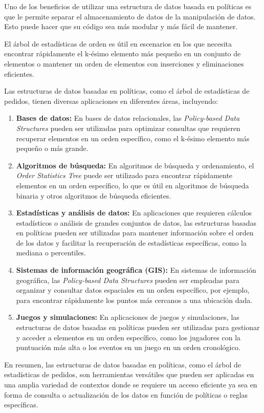 Uno de los beneficios de utilizar una estructura de datos basada en políticas es que le permite separar el almacenamiento de datos de la manipulación de datos. Esto puede hacer que su código sea más modular y más fácil de mantener.

El árbol de estadísticas de orden es útil en escenarios en los que necesita encontrar rápidamente el k-ésimo elemento más pequeño en un conjunto de elementos o mantener un orden de elementos con inserciones y eliminaciones eficientes.

Las estructuras de datos basadas en políticas, como el árbol de estadísticas de pedidos, tienen diversas aplicaciones en diferentes áreas, incluyendo:

\begin{enumerate}
	\item \textbf{Bases de datos:} En bases de datos relacionales, las \emph{Policy-based Data Structures} pueden ser utilizadas para optimizar consultas que requieren recuperar elementos en un orden específico, como el k-ésimo elemento más pequeño o más grande.
	
	\item \textbf{Algoritmos de búsqueda:} En algoritmos de búsqueda y ordenamiento, el \emph{Order Statistics Tree} puede ser utilizado para encontrar rápidamente elementos en un orden específico, lo que es útil en algoritmos de búsqueda binaria y otros algoritmos de búsqueda eficientes.
	
	\item \textbf{Estadísticas y análisis de datos:} En aplicaciones que requieren cálculos estadísticos o análisis de grandes conjuntos de datos, las estructuras basadas en políticas pueden ser utilizadas para mantener información sobre el orden de los datos y facilitar la recuperación de estadísticas específicas, como la mediana o percentiles.
	
	\item \textbf{Sistemas de información geográfica (GIS):} En sistemas de información geográfica, las \emph{Policy-based Data Structures} pueden ser empleadas para organizar y consultar datos espaciales en un orden específico, por ejemplo, para encontrar rápidamente los puntos más cercanos a una ubicación dada.
	
	\item \textbf{Juegos y simulaciones:} En aplicaciones de juegos y simulaciones, las estructuras de datos basadas en políticas pueden ser utilizadas para gestionar y acceder a elementos en un orden específico, como los jugadores con la puntuación más alta o los eventos en un juego en un orden cronológico.
	  
\end{enumerate}

En resumen, las estructuras de datos basadas en políticas, como el árbol de estadísticas de pedidos, son herramientas versátiles que pueden ser aplicadas en una amplia variedad de contextos donde se requiere un acceso eficiente ya sea en forma de consulta o actualización de los datos en función de políticas o reglas específicas.
